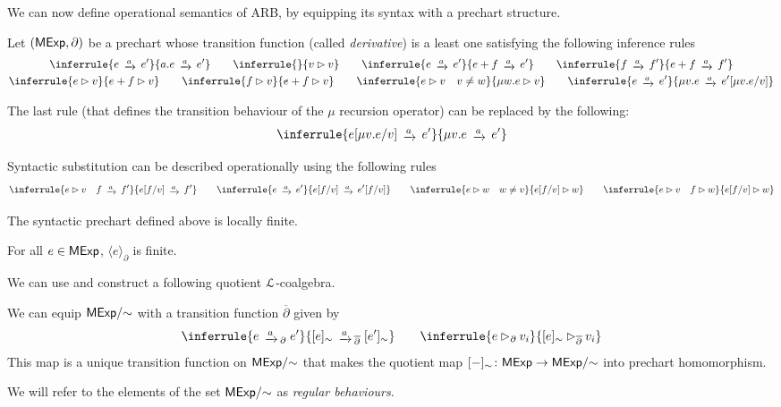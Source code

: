 We can now define operational semantics of ARB, by equipping its syntax with a prechart structure.
\begin{definition}\label{def:operational_semantics}
	Let $(\mathsf{MExp}, \partial)$ be a prechart whose transition function (called \emph{derivative}) is a least one satisfying the following inference rules
	\begin{gather*}
		\inferrule{e \tr{a} e' }{a.e \tr{a} e'} \qquad \inferrule{ }{v \rhd v} \qquad \inferrule{e \tr{a} e'}{e + f \tr{a} e'} \qquad \inferrule{f \tr{a} f'}{e + f \tr{a} f'}\\
		\inferrule {e \rhd v}{e + f \rhd v} \qquad \inferrule {f \rhd v}{e + f \rhd v} \qquad \inferrule{e \rhd v\quad v \neq w}{\mu w.e \rhd v } \qquad \inferrule{e \tr{a} e'}{\mu v. e \tr{a} e'[\mu v .e / v]}
	\end{gather*}
\end{definition}
\begin{remark}
	The last rule (that defines the transition behaviour of the $\mu$ recursion operator) can be replaced by the following:
	\begin{gather*}
		\inferrule{e[\mu v. e / v] \tr{a} e'}{\mu v. e \tr{a} e'}
	\end{gather*}
\end{remark}

\begin{remark}\label{rem:semantic-substitution}
	Syntactic substitution can be described operationally using the following rules
	\begin{gather*}
		\inferrule{e \rhd v\quad f\tr{a} f'}{e[f / v] \tr{a} f'}\qquad \inferrule{e \tr{a} e'}{e[f / v] \tr{a} e'[f/v]}\qquad \inferrule{e \rhd w \quad w \neq v }{e[f/v] \rhd w} \qquad \inferrule{e \rhd v \quad f \rhd w}{e[f/v] \rhd w}
	\end{gather*}
\end{remark}
The syntactic prechart defined above is locally finite.
\begin{lemma}
	For all $e \in \mathsf{MExp}$, $\langle e \rangle_\partial$ is finite.
\end{lemma}
We can use  and construct a following quotient $\mathcal{L}$-coalgebra.
\begin{lemma}\label{lem:quotient_chart}	
	We can equip ${\mathsf{MExp}}/{\sim}$ with a transition function $\overline\partial$ given by
	$$
	\inferrule{e \tr{a}_\partial e'}{[e]_\sim \tr{a}_{\overline\partial} [e']_\sim} \qquad \inferrule{e \rhd_{\partial} v_i}{[e]_\sim \rhd_{\overline{\partial}} v_i}
	$$
	This map is a unique transition function on ${\mathsf{MExp}}/{\sim}$ that makes the quotient map $[-]_{\sim} \colon \mathsf{MExp} \to {\mathsf{MExp}}/{\sim}$ into prechart homomorphism.
\end{lemma}
We will refer to the elements of the set $\mathsf{MExp}/{\sim}$ as \emph{regular behaviours}.

